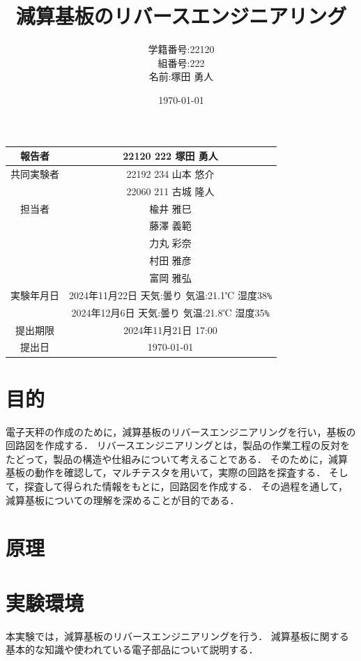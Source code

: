 \documentclass[a4paper,11pt,dvipdfmx]{jsarticle}
\begin{document}
\begin{table}[b]
  \centering
  \begin{tabular}{|c|c|}
    \hline
    報告者     & 22120 222 塚田 勇人 \\
    \hline
    共同実験者 & 22192 234 山本 悠介  \\ & 22060 211 古城 隆人\\
    \hline
    担当者     & 楡井 雅巳 \\
              &  藤澤 義範\\
    &力丸 彩奈\\
    &村田 雅彦\\
    &富岡 雅弘\\
    \hline
    実験年月日 & 2024年11月22日 天気:曇り 気温:21.1℃ 湿度38\verb#%#\\
    & 2024年12月6日 天気:曇り 気温:21.8℃ 湿度35\verb#%#\\
    \hline
    提出期限   & 2024年11月21日 17:00  \\
    \hline
    提出日     & \today              \\
    \hline
  \end{tabular}
\end{table}



\title{減算基板のリバースエンジニアリング}
\author{学籍番号:22120 \\ 組番号:222 \\名前:塚田 勇人}
\date{\today}
\maketitle

\newpage

\section{目的}
電子天秤の作成のために，減算基板のリバースエンジニアリングを行い，基板の回路図を作成する．
リバースエンジニアリングとは，製品の作業工程の反対をたどって，製品の構造や仕組みについて考えることである．
そのために，減算基板の動作を確認して，マルチテスタを用いて，実際の回路を探査する．
そして，探査して得られた情報をもとに，回路図を作成する．
その過程を通して，減算基板についての理解を深めることが目的である．

\section{原理}

\section{実験環境}
本実験では，減算基板のリバースエンジニアリングを行う．
減算基板に関する基本的な知識や使われている電子部品について説明する．
\end{document}
